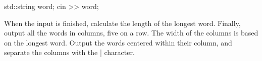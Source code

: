 \begin{itemize}
\begin{cpp}
std::string word;
cin >> word;
\end{cpp}

When the input is finished, calculate the length of the longest word. Finally, output all the words in columns, five on a row. The width of the columns is based on the longest word. Output the words centered within their column, and separate the columns with the | character.
\end{itemize}


